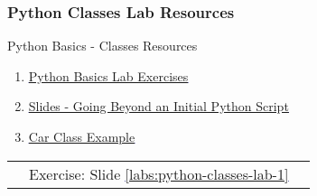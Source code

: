 \documentclass[handout, 11pt]{beamer}
\begin{document}
\begin{frame}
\frametitle{Python Classes Lab Resources}
{
\begin{block}{Python Basics - Classes Resources}
\begin{enumerate}
\item \textcolor{blue}{\underline{\href{https://nickderobertis.github.io/fin-model-course/\_static/Materials for Lab Exercises/Python Basics/Python Basics Lab.ipynb}{Python Basics Lab Exercises}}}
\item \textcolor{blue}{\underline{\href{https://nickderobertis.github.io/fin-model-course/\_static/generated/pdfs/S4 Going Beyond an Initial Python Script.pdf}{Slides - Going Beyond an Initial Python Script}}}
\item \textcolor{blue}{\underline{\href{https://nickderobertis.github.io/fin-model-course/\_static/Examples/Introduction/Python/car\_example.py}{Car Class Example}}}
\end{enumerate}
\vfill
\begin{tabular*}{\textwidth}{@{\extracolsep{\fill}}ccc}
\toprule
\hfill & Exercise: Slide \textcolor{blue}{\underline{\ref{labs:python-classes-lab-1}}} & \hfill\\

\end{tabular*}
\end{block}
}
\label{labs:python-classes-lab-1-resources}
\end{frame}
\setcounter{framenumber}{\value{finalframe}}
\end{document}
